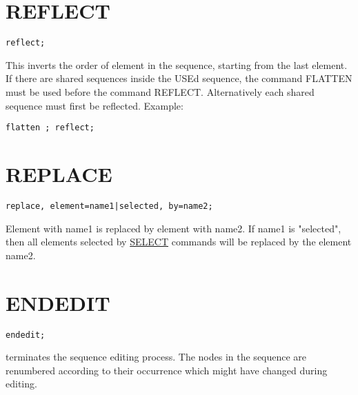 \section{REFLECT}
\begin{verbatim}
reflect;
\end{verbatim} 
This inverts the order of element in the sequence, starting from the
last element. \\ 
If there are shared sequences inside the USEd sequence, the command
FLATTEN must be used before the command REFLECT.  Alternatively each
shared sequence must first be reflected. Example:   
\begin{verbatim}
flatten ; reflect; 
\end{verbatim}


\section{REPLACE}
\begin{verbatim}
replace, element=name1|selected, by=name2;
\end{verbatim} 
Element with name1 is replaced by element with name2. 
If name1 is "selected", then all elements selected by
\href{../Introduction/select.html}{SELECT} commands will be replaced by
the element name2.  


\section{ENDEDIT}
\begin{verbatim}
endedit;
\end{verbatim} 
terminates the sequence editing process. The nodes in the sequence are
renumbered according to their occurrence which might have changed during
editing.  


